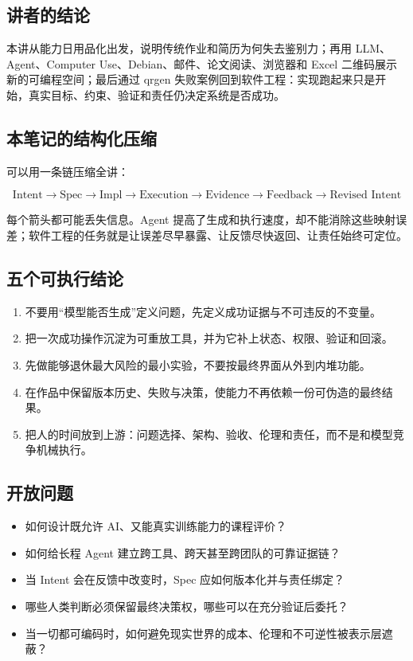 \documentclass[a4paper,11pt]{article}
\begin{document}
\subsection{讲者的结论}

本讲从能力日用品化出发，说明传统作业和简历为何失去鉴别力；再用 LLM、Agent、Computer Use、Debian、邮件、论文阅读、浏览器和 Excel 二维码展示新的可编程空间；最后通过 qrgen 失败案例回到软件工程：实现跑起来只是开始，真实目标、约束、验证和责任仍决定系统是否成功。

\subsection{本笔记的结构化压缩}

可以用一条链压缩全讲：

\[
\text{Intent}
\longrightarrow \text{Spec}
\longrightarrow \text{Impl}
\longrightarrow \text{Execution}
\longrightarrow \text{Evidence}
\longrightarrow \text{Feedback}
\longrightarrow \text{Revised Intent}
\]

每个箭头都可能丢失信息。Agent 提高了生成和执行速度，却不能消除这些映射误差；软件工程的任务就是让误差尽早暴露、让反馈尽快返回、让责任始终可定位。

\subsection{五个可执行结论}

\begin{enumerate}
  \item 不要用“模型能否生成”定义问题，先定义成功证据与不可违反的不变量。
  \item 把一次成功操作沉淀为可重放工具，并为它补上状态、权限、验证和回滚。
  \item 先做能够退休最大风险的最小实验，不要按最终界面从外到内堆功能。
  \item 在作品中保留版本历史、失败与决策，使能力不再依赖一份可伪造的最终结果。
  \item 把人的时间放到上游：问题选择、架构、验收、伦理和责任，而不是和模型竞争机械执行。
\end{enumerate}

\subsection{开放问题}

\begin{itemize}
  \item 如何设计既允许 AI、又能真实训练能力的课程评价？
  \item 如何给长程 Agent 建立跨工具、跨天甚至跨团队的可靠证据链？
  \item 当 Intent 会在反馈中改变时，Spec 应如何版本化并与责任绑定？
  \item 哪些人类判断必须保留最终决策权，哪些可以在充分验证后委托？
  \item 当一切都可编码时，如何避免现实世界的成本、伦理和不可逆性被表示层遮蔽？
\end{itemize}
\end{document}

